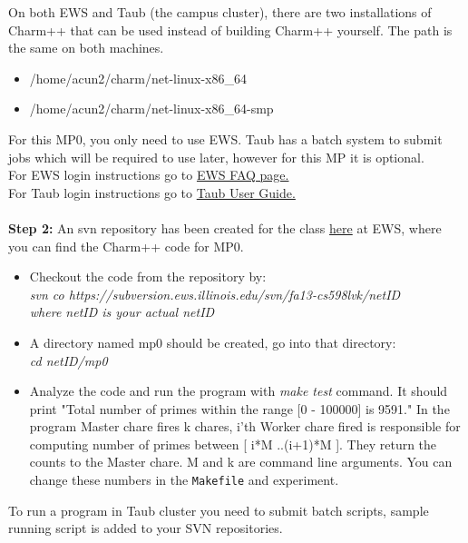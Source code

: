 \documentclass{article}
\begin{document}
On both EWS and Taub (the campus cluster), there are two installations of Charm++ that can
be used instead of building Charm++ yourself. The path is the same on both machines.
\begin{itemize}
\item /home/acun2/charm/net-linux-x86\_64
\item /home/acun2/charm/net-linux-x86\_64-smp\\
\end{itemize}
For this MP0, you only need to use EWS. Taub has a batch
system to submit jobs which will be required to use later, however for this MP
it is optional.\\
For EWS login instructions go to
\href{http://it.engineering.illinois.edu/ews/lab-information/ews-faq}{EWS FAQ
page.} \\
For Taub login instructions go to
\href{https://campuscluster.illinois.edu/user\_info/doc/}{Taub User Guide.} \\
\\
\textbf{Step 2:} An svn repository has been created for the class
\href{https://subversion.ews.illinois.edu/svn/fa13-cs598lvk/}{here} at EWS, where you can find the Charm++ code for MP0. \\
\begin{itemize}
\item Checkout the code from the repository by: \\
        \textit{svn co
        https://subversion.ews.illinois.edu/svn/fa13-cs598lvk/netID \\
        where netID is your actual netID}
\item A directory named mp0 should be created, go into that directory: \\
        \textit{cd netID/mp0}
\item Analyze the code and run the program with \textit{make test} command.
It should print "Total number of primes within the range [0 - 100000] is 9591." In the program Master chare fires k chares, i'th Worker chare fired is responsible for
computing number of primes between [ i*M ..(i+1)*M ]. They return the counts to
the Master chare. M and k are command line arguments. You can change these numbers in the \texttt{Makefile} and experiment.

\end{itemize}
    To run a program in Taub cluster you need to submit batch scripts, sample
    running script is added to your SVN repositories.  \\
\end{document}
